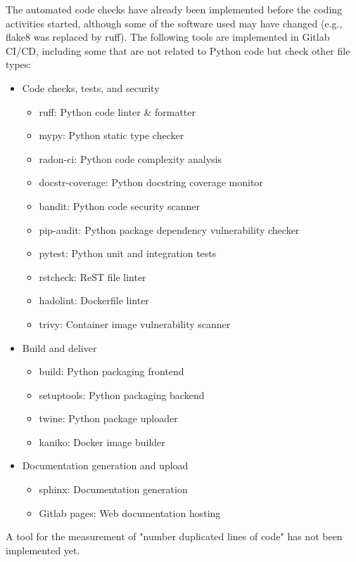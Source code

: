 The automated code checks have already been implemented before the coding activities started, although some of the software used may have changed (e.g., flake8 was replaced by ruff). The following tools are implemented in Gitlab CI/CD, including some that are not related to Python code but check other file types:

\begin{itemize}
    \item Code checks, tests, and security
    \begin{itemize}
        \item ruff: Python code linter \& formatter
        \item mypy: Python static type checker
        \item radon-ci: Python code complexity analysis
        \item docstr-coverage: Python docstring coverage monitor
        \item bandit: Python code security scanner
        \item pip-audit: Python package dependency vulnerability checker
        \item pytest: Python unit and integration tests
        \item rstcheck: ReST file linter
        \item hadolint: Dockerfile linter
        \item trivy: Container image vulnerability scanner
    \end{itemize}
    \item Build and deliver
    \begin{itemize}
        \item build: Python packaging frontend
        \item setuptools: Python packaging backend
        \item twine: Python package uploader
        \item kaniko: Docker image builder
    \end{itemize}
    \item Documentation generation and upload
    \begin{itemize}
        \item sphinx: Documentation generation
        \item Gitlab pages: Web documentation hosting
    \end{itemize}
\end{itemize}

A tool for the measurement of "number duplicated lines of code" has not been implemented yet.


